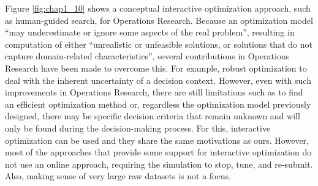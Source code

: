 Figure \ref{fig:chap1_10} \cite{Meignan2015Review}
shows a conceptual interactive optimization approach, such as human-guided
search, for Operations Research. Because an optimization model ``may
underestimate or ignore some aspects of the real problem'', resulting in
computation of either ``unrealistic or unfeasible solutions, or
solutions that do not capture domain-related characteristics'', several
contributions in Operations Research have been made to overcome this.
For example, robust optimization to deal with the inherent uncertainty
of a decision context. However, even with such improvements in
Operations Research, there are still limitations such as to find an
efficient optimization method or, regardless the optimization model
previously designed, there may be specific decision criteria that remain
unknown and will only be found during the decision-making process. For
this, interactive optimization can be used and they share the same
motivations as ours. However, most of the approaches that provide some
support for interactive optimization do not use an online approach,
requiring the simulation to stop, tune, and re-submit. Also, making
sense of very large raw datasets is not a focus.



